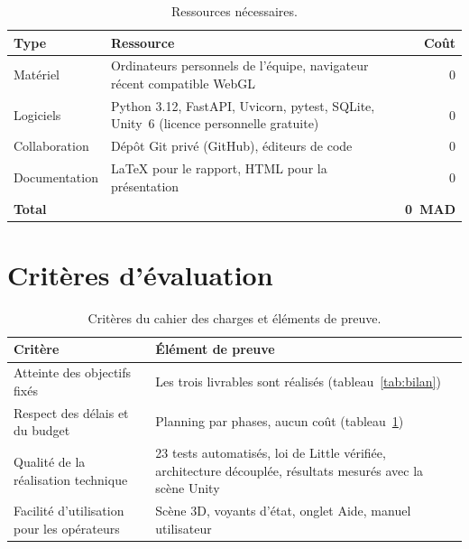 \begin{table}[H]
\centering
\caption{Ressources nécessaires.}
\label{tab:ressources}
\begin{tabularx}{\textwidth}{@{}l X r@{}}
\toprule
\textbf{Type} & \textbf{Ressource} & \textbf{Coût} \\
\midrule
Matériel & Ordinateurs personnels de l'équipe, navigateur récent compatible WebGL & 0 \\
Logiciels & Python 3.12, FastAPI, Uvicorn, pytest, SQLite, Unity~6 (licence personnelle gratuite) & 0 \\
Collaboration & Dépôt Git privé (GitHub), éditeurs de code & 0 \\
Documentation & \LaTeX{} pour le rapport, HTML pour la présentation & 0 \\
\midrule
\textbf{Total} & & \textbf{0~MAD} \\
\bottomrule
\end{tabularx}
\end{table}

\section{Critères d'évaluation}

\begin{table}[H]
\centering
\caption{Critères du cahier des charges et éléments de preuve.}
\label{tab:criteres}
\begin{tabularx}{\textwidth}{@{}l X@{}}
\toprule
\textbf{Critère} & \textbf{Élément de preuve} \\
\midrule
Atteinte des objectifs fixés & Les trois livrables sont réalisés (tableau~\ref{tab:bilan}) \\
Respect des délais et du budget & Planning par phases, aucun coût (tableau~\ref{tab:ressources}) \\
Qualité de la réalisation technique & 23 tests automatisés, loi de Little vérifiée, architecture découplée, résultats mesurés avec la scène Unity \\
Facilité d'utilisation pour les opérateurs & Scène 3D, voyants d'état, onglet Aide, manuel utilisateur \\
\bottomrule
\end{tabularx}
\end{table}
